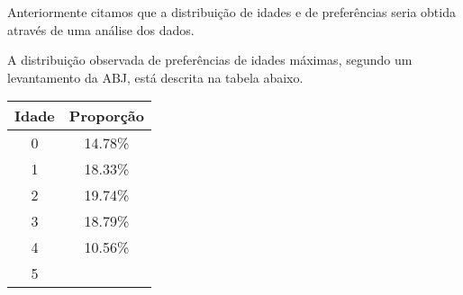 \documentclass[]{book}
\begin{document}
Anteriormente citamos que a distribuição de idades e de preferências
seria obtida através de uma análise dos dados.

A distribuição observada de preferências de idades máximas, segundo um
levantamento da ABJ, está descrita na tabela abaixo.

\begin{longtable}[]{@{}cc@{}}
\toprule
\begin{minipage}[b]{0.10\columnwidth}\centering\strut
Idade
\strut\end{minipage} &
\begin{minipage}[b]{0.14\columnwidth}\centering\strut
Proporção
\strut\end{minipage}\tabularnewline
\midrule
\endhead
\begin{minipage}[t]{0.10\columnwidth}\centering\strut
0
\strut\end{minipage} &
\begin{minipage}[t]{0.14\columnwidth}\centering\strut
14.78\%
\strut\end{minipage}\tabularnewline
\begin{minipage}[t]{0.10\columnwidth}\centering\strut
1
\strut\end{minipage} &
\begin{minipage}[t]{0.14\columnwidth}\centering\strut
18.33\%
\strut\end{minipage}\tabularnewline
\begin{minipage}[t]{0.10\columnwidth}\centering\strut
2
\strut\end{minipage} &
\begin{minipage}[t]{0.14\columnwidth}\centering\strut
19.74\%
\strut\end{minipage}\tabularnewline
\begin{minipage}[t]{0.10\columnwidth}\centering\strut
3
\strut\end{minipage} &
\begin{minipage}[t]{0.14\columnwidth}\centering\strut
18.79\%
\strut\end{minipage}\tabularnewline
\begin{minipage}[t]{0.10\columnwidth}\centering\strut
4
\strut\end{minipage} &
\begin{minipage}[t]{0.14\columnwidth}\centering\strut
10.56\%
\strut\end{minipage}\tabularnewline
\begin{minipage}[t]{0.10\columnwidth}\centering\strut
5
\strut\end{minipage} &

\end{longtable}
\end{document}
